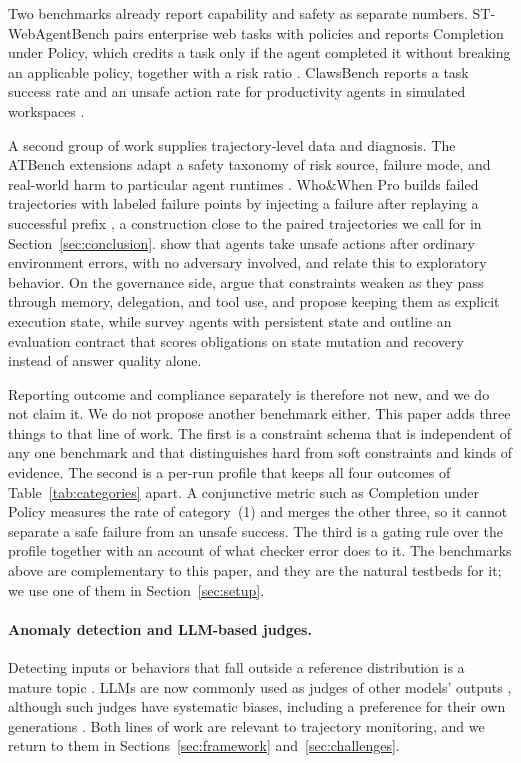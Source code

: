 \documentclass{article}
\begin{document}
Two benchmarks already report capability and safety as separate numbers. ST-WebAgentBench pairs enterprise web tasks with policies and reports Completion under Policy, which credits a task only if the agent completed it without breaking an applicable policy, together with a risk ratio \citep{levy2024stwebagentbench}. ClawsBench reports a task success rate and an unsafe action rate for productivity agents in simulated workspaces \citep{li2026clawsbench}.

A second group of work supplies trajectory-level data and diagnosis. The ATBench extensions adapt a safety taxonomy of risk source, failure mode, and real-world harm to particular agent runtimes \citep{yang2026atbench}. Who\&When Pro builds failed trajectories with labeled failure points by injecting a failure after replaying a successful prefix \citep{liu2026whowhenpro}, a construction close to the paired trajectories we call for in Section~\ref{sec:conclusion}. \citet{jha2026meltdowns} show that agents take unsafe actions after ordinary environment errors, with no adversary involved, and relate this to exploratory behavior. On the governance side, \citet{li2026constraintdrift} argue that constraints weaken as they pass through memory, delegation, and tool use, and propose keeping them as explicit execution state, while \citet{ding2026alwayson} survey agents with persistent state and outline an evaluation contract that scores obligations on state mutation and recovery instead of answer quality alone.

Reporting outcome and compliance separately is therefore not new, and we do not claim it. We do not propose another benchmark either. This paper adds three things to that line of work. The first is a constraint schema that is independent of any one benchmark and that distinguishes hard from soft constraints and kinds of evidence. The second is a per-run profile that keeps all four outcomes of Table~\ref{tab:categories} apart. A conjunctive metric such as Completion under Policy measures the rate of category~(1) and merges the other three, so it cannot separate a safe failure from an unsafe success. The third is a gating rule over the profile together with an account of what checker error does to it. The benchmarks above are complementary to this paper, and they are the natural testbeds for it; we use one of them in Section~\ref{sec:setup}.

\paragraph{Anomaly detection and LLM-based judges.}
Detecting inputs or behaviors that fall outside a reference distribution is a mature topic \citep{chandola2009anomaly,hendrycks2017baseline}. LLMs are now commonly used as judges of other models' outputs \citep{zheng2023judging}, although such judges have systematic biases, including a preference for their own generations \citep{panickssery2024llm}. Both lines of work are relevant to trajectory monitoring, and we return to them in Sections~\ref{sec:framework} and~\ref{sec:challenges}.
\end{document}
